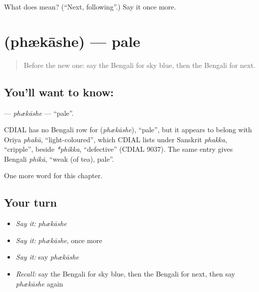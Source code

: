 \begin{tcolorbox}[breakable,colback=teal!4,colframe=teal!35!black,title={Before you move on}]
What does  mean? (\textquotedblleft{}Next, following\textquotedblright{}.) Say it once more.
\end{tcolorbox}
\section[\texorpdfstring{\bn{ফ্যাকাশে} (phækāshe)}{ফ্যাকাশে (phækāshe)}]{ (phækāshe) — pale}

\label{lesson:BN-C247-phkashe}



\begin{quote}
Before the new one: say the Bengali for sky blue, then the Bengali for next.
\end{quote}

\subsection*{You'll want to know: }
\textbf{} — \emph{phækāshe} — \textquotedblleft{}pale\textquotedblright{}.

\begin{cousinweb}
CDIAL has no Bengali row for \textbf{} (\emph{phækāshe}), \textquotedblleft{}pale\textquotedblright{}, but it appears to belong with Oriya \emph{phakā}, \textquotedblleft{}light-coloured\textquotedblright{}, which CDIAL lists under Sanskrit \emph{phakka}, \textquotedblleft{}cripple\textquotedblright{}, beside \emph{*phikka}, \textquotedblleft{}defective\textquotedblright{} (CDIAL 9037). The same entry gives Bengali \emph{phikā}, \textquotedblleft{}weak (of tea), pale\textquotedblright{}.
\end{cousinweb}

\begin{grammarlens}[title={What you've built}]
One more word for this chapter.
\end{grammarlens}

\subsection*{Your turn}
\begin{itemize}
\raggedright
  \item \emph{Say it:} \emph{phækāshe}
  \item \emph{Say it:} \emph{phækāshe}, once more
  \item \emph{Say it:} say \emph{phækāshe}
  \item \emph{Recall:} say the Bengali for sky blue, then the Bengali for next, then say \emph{phækāshe} again
\end{itemize}

